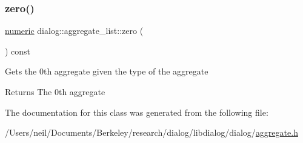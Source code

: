 \subsubsection{\texorpdfstring{zero()}{zero()}}
{\footnotesize\ttfamily \hyperlink{classdialog_1_1numeric}{numeric} dialog\+::aggregate\+\_\+list\+::zero (\begin{DoxyParamCaption}{ }\end{DoxyParamCaption}) const\hspace{0.3cm}{\ttfamily [inline]}}

Gets the 0th aggregate given the type of the aggregate \begin{DoxyReturn}{Returns}
The 0th aggregate 
\end{DoxyReturn}


The documentation for this class was generated from the following file\+:\begin{DoxyCompactItemize}
\item 
/\+Users/neil/\+Documents/\+Berkeley/research/dialog/libdialog/dialog/\hyperlink{aggregate_8h}{aggregate.\+h}\end{DoxyCompactItemize}
